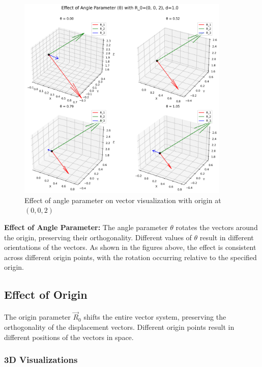 \begin{figure}[H]
    \centering
    \includegraphics[width=0.9\textwidth]{figures/theta_effect_R0_0_0_2.png}
    \caption{Effect of angle parameter on vector visualization with origin at $(0,0,2)$}
    \label{fig:example_angle_effect_custom2}
\end{figure}

\textbf{Effect of Angle Parameter:} The angle parameter $\theta$ rotates the vectors around the origin, preserving their orthogonality. Different values of $\theta$ result in different orientations of the vectors. As shown in the figures above, the effect is consistent across different origin points, with the rotation occurring relative to the specified origin.

\subsection{Effect of Origin}

The origin parameter $\vec{R}_0$ shifts the entire vector system, preserving the orthogonality of the displacement vectors. Different origin points result in different positions of the vectors in space.

\subsubsection{3D Visualizations}

